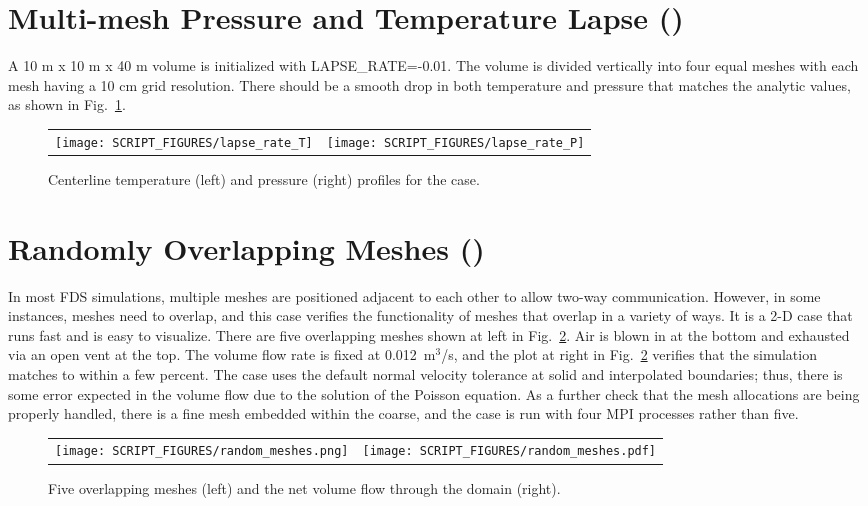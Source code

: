 \documentclass[11pt]{book}
\begin{document}
\section{Multi-mesh Pressure and Temperature Lapse (\texorpdfstring{}{lapse\_rate})}
\label{lapse_rate}

A 10 m x 10 m x 40 m volume is initialized with {\ct LAPSE\_RATE=-0.01}.  The volume is divided vertically into four equal meshes with each mesh having a 10 cm grid resolution.  There should be a smooth drop in both temperature and pressure that matches the analytic values, as shown in Fig.~\ref{lapse_rate_fig}.

\begin{figure}[!ht]
\begin{tabular*}{\textwidth}{lr}
\texttt{[image: SCRIPT\_FIGURES/lapse\_rate\_T]} &
\texttt{[image: SCRIPT\_FIGURES/lapse\_rate\_P]}
\end{tabular*}
\caption[The  test case]{Centerline temperature (left) and pressure (right) profiles for the  case.}
\label{lapse_rate_fig}
\end{figure}


\section{Randomly Overlapping Meshes (\texorpdfstring{}{random\_meshes})}
\label{random_meshes}

In most FDS simulations, multiple meshes are positioned adjacent to each other to allow two-way communication. However, in some instances, meshes need to overlap, and this case verifies the functionality of meshes that overlap in a variety of ways. It is a 2-D case that runs fast and is easy to visualize. There are five overlapping meshes shown at left in Fig.~\ref{random_meshes_fig}. Air is blown in at the bottom and exhausted via an open vent at the top. The volume flow rate is fixed at 0.012~m$^3$/s, and the plot at right in Fig.~\ref{random_meshes_fig} verifies that the simulation matches to within a few percent. The case uses the default normal velocity tolerance at solid and interpolated boundaries; thus, there is some error expected in the volume flow due to the solution of the Poisson equation. As a further check that the mesh allocations are being properly handled, there is a fine mesh embedded within the coarse, and the case is run with four MPI processes rather than five.

\begin{figure}[!ht]
\begin{tabular*}{\textwidth}{lr}
\texttt{[image: SCRIPT\_FIGURES/random\_meshes.png]} &
\texttt{[image: SCRIPT\_FIGURES/random\_meshes.pdf]}
\end{tabular*}
\caption[The  test case]{Five overlapping meshes (left) and the net volume flow through the domain (right).}
\label{random_meshes_fig}
\end{figure}
\end{document}
